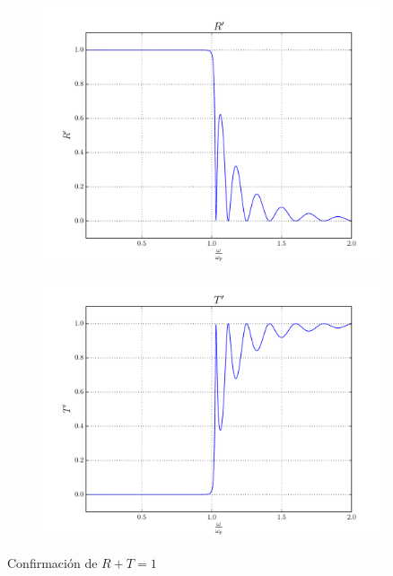 \documentclass[a4paper,11pt]{article}
\begin{document}
                            \begin{figure}[!ht]
                            \centering \includegraphics[width=0.9\textwidth]{Punto1BC/Rp.pdf}
                            \end{figure}
                            \begin{figure}[!ht]
                            \centering \includegraphics[width=0.9\textwidth]{Punto1BC/Tp.pdf}
                            \end{figure}
Confirmación de $R+T=1$
\end{document}
